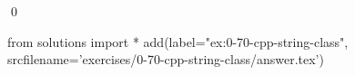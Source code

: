 
\begin{ex}
  \label{ex:0-70-cpp-string-class}
  
  \qed
\end{ex}
\begin{python0}
from solutions import *
add(label="ex:0-70-cpp-string-class",
    srcfilename='exercises/0-70-cpp-string-class/answer.tex')
\end{python0}
